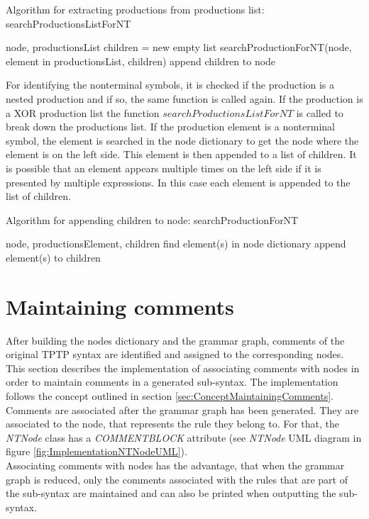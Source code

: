 \begin{algorithm}[H]
\caption{Algorithm for extracting productions from productions list: searchProductionsListForNT}
\begin{algorithmic}[1] 
\Require node, productionsList
	\State children = new empty list
	\State searchProductionForNT(node, element in productionsList, children)
	\State append children to node
\EndFor
\end{algorithmic}
\end{algorithm}

For identifying the nonterminal symbols, it is checked if the production is a nested production and if so, the same function is called again.
If the production is a XOR production list the function $searchProductionsListForNT$ is called to break down the productions list.
If the production element is a nonterminal symbol, the element is searched in the node dictionary to get the node where the element is on the left side.
This element is then appended to a list of children. It is possible that an element appears multiple times on the left side if it is presented by multiple expressions.
In this case each element is appended to the list of children.

\begin{algorithm}[H]
\caption{Algorithm for appending children to node: searchProductionForNT}
\begin{algorithmic}[1] 
\Require node, productionsElement, children
		\State find element(s) in node dictionary
		\State append element(s) to children
	\EndIf
\EndFor
\end{algorithmic}
\end{algorithm}

\section{Maintaining comments}\label{sec:ImplementationMaintainingComments}

After building the nodes dictionary and the grammar graph, comments of the original \ac{TPTP} syntax are identified and assigned to the corresponding nodes.
This section describes the implementation of associating comments with nodes in order to maintain comments in a generated sub-syntax.
The implementation follows the concept outlined in section \ref{sec:ConceptMaintainingComments}.
Comments are associated after the grammar graph has been generated.
They are associated to the node, that represents the rule they belong to.
For that, the \textit{NTNode} class has a \textit{COMMENT\textunderscore BLOCK} attribute (see \textit{NTNode} UML diagram in figure \ref{fig:ImplementationNTNodeUML}).\\
Associating comments with nodes has the advantage, that when the grammar graph is reduced, only the comments associated with the rules that are part of the sub-syntax are maintained and can also be printed when outputting the sub-syntax.\\


